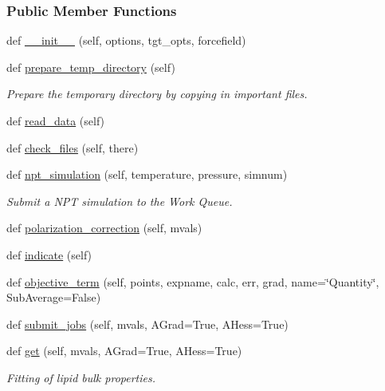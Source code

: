 \subsubsection*{Public Member Functions}
\begin{DoxyCompactItemize}
\item 
def \hyperlink{classsrc_1_1lipid_1_1Lipid_a3ee96b07d26ea757f06f2b51fd8f68c8}{\+\_\+\+\_\+init\+\_\+\+\_\+} (self, options, tgt\+\_\+opts, forcefield)
\item 
def \hyperlink{classsrc_1_1lipid_1_1Lipid_a0571b5cf5b10a169eb7afee468dd3a61}{prepare\+\_\+temp\+\_\+directory} (self)
\begin{DoxyCompactList}\small\item\em Prepare the temporary directory by copying in important files. \end{DoxyCompactList}\item 
def \hyperlink{classsrc_1_1lipid_1_1Lipid_a3b13700c93a2c711749c535a04f59008}{read\+\_\+data} (self)
\item 
def \hyperlink{classsrc_1_1lipid_1_1Lipid_a552b527d87a715fc0e5bba641bfaef4d}{check\+\_\+files} (self, there)
\item 
def \hyperlink{classsrc_1_1lipid_1_1Lipid_acc748653a328afae3ab3c61d7e69314d}{npt\+\_\+simulation} (self, temperature, pressure, simnum)
\begin{DoxyCompactList}\small\item\em Submit a N\+PT simulation to the Work Queue. \end{DoxyCompactList}\item 
def \hyperlink{classsrc_1_1lipid_1_1Lipid_a1f3a778454c17956bee3e2fbc82ed41d}{polarization\+\_\+correction} (self, mvals)
\item 
def \hyperlink{classsrc_1_1lipid_1_1Lipid_a1568b7a3ac5e2bbc5b0893feb174e9bd}{indicate} (self)
\item 
def \hyperlink{classsrc_1_1lipid_1_1Lipid_a6c3b17049534baa97adc428f2e60c4d7}{objective\+\_\+term} (self, points, expname, calc, err, grad, name=\char`\"{}Quantity\char`\"{}, Sub\+Average=False)
\item 
def \hyperlink{classsrc_1_1lipid_1_1Lipid_add85e5fe4603baf97f3f2d0ef2647d0e}{submit\+\_\+jobs} (self, mvals, A\+Grad=True, A\+Hess=True)
\item 
def \hyperlink{classsrc_1_1lipid_1_1Lipid_abee27b196cebb83890d15359ef80e1e6}{get} (self, mvals, A\+Grad=True, A\+Hess=True)
\begin{DoxyCompactList}\small\item\em Fitting of lipid bulk properties. \end{DoxyCompactList}\end{DoxyCompactItemize}
